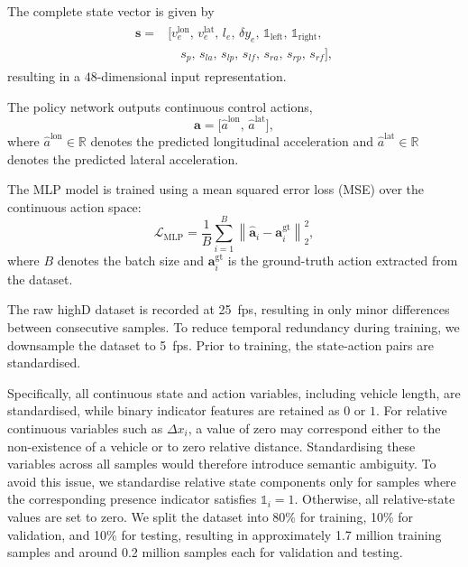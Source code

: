 \documentclass[journal]{IEEEtran}
\begin{document}
The complete state vector is given by
\begin{align}\label{eq:dataDrivenStates}
\begin{split}
    \mathbf{s} =
    &\bigl[
        v_e^{\text{lon}},\,
        v_e^{\text{lat}},\,
        l_e,\,
        \delta y_e,\,
        \mathds{1}_{\text{left}},\,
        \mathds{1}_{\text{right}},\, \\
        & \quad s_{p},\,
        s_{la},\,
        s_{lp},\,
        s_{lf},\,
        s_{ra},\,
        s_{rp},\,
        s_{rf}
    \bigr],
\end{split}
\end{align}
resulting in a $48$-dimensional input representation.

The policy network outputs continuous control actions,
\begin{equation}\label{eq:dataDrivenActions}
    \mathbf{a} =
    \bigl[
        \hat{a}^{\text{lon}},\,
        \hat{a}^{\text{lat}}
    \bigr],
\end{equation}
where $\hat{a}^{\text{lon}} \in \mathbb{R}$ denotes the predicted longitudinal acceleration and $\hat{a}^{\text{lat}} \in \mathbb{R}$ denotes the predicted lateral acceleration.

The MLP model is trained using a mean squared error loss (MSE) over the continuous action space:
\begin{equation}
    \mathcal{L}_{\text{MLP}}
    =
    \frac{1}{B}
    \sum_{i=1}^{B}
    \left\|
        \hat{\mathbf{a}}_i - \mathbf{a}_i^{\text{gt}}
    \right\|_2^2,
\end{equation}
where $B$ denotes the batch size and $\mathbf{a}_i^{\text{gt}}$ is the ground-truth action extracted from the dataset.

The raw highD dataset is recorded at 25~fps, resulting in only minor differences between consecutive samples. To reduce temporal redundancy during training, we downsample the dataset to 5~fps. Prior to training, the state-action pairs are standardised.

Specifically, all continuous state and action variables, including vehicle length, are standardised, while binary indicator features are retained as $0$ or $1$. For relative continuous variables such as $\Delta x_i$, a value of zero may correspond either to the non-existence of a vehicle or to zero relative distance. Standardising these variables across all samples would therefore introduce semantic ambiguity. To avoid this issue, we standardise relative state components only for samples where the corresponding presence indicator satisfies $\mathds{1}_i = 1$. Otherwise, all relative-state values are set to zero. We split the dataset into 80\% for training, 10\% for validation, and 10\% for testing, resulting in approximately 1.7 million training samples and around 0.2 million samples each for validation and testing.
\end{document}
